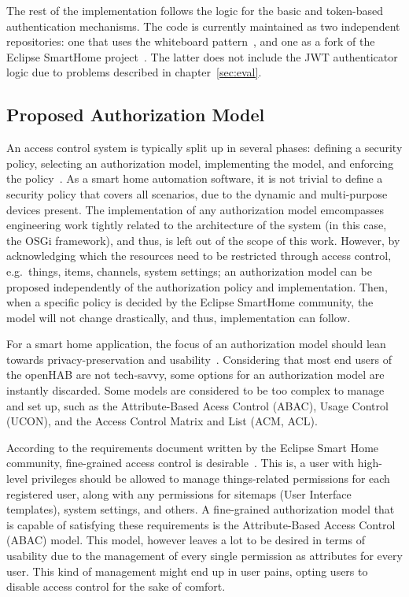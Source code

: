 \documentclass[12pt]{article}
\begin{document}
The rest of the implementation follows the logic for the basic and token-based authentication mechanisms. The code is currently maintained as two independent repositories: one that uses the whiteboard pattern~\cite{repo_02}, and one as a fork of the Eclipse SmartHome project~\cite{repo_01}. The latter does not include the JWT authenticator logic due to problems described in chapter~\ref{sec:eval}.
  
\subsection{Proposed Authorization Model}
\label{ssec:autho}

An access control system is typically split up in several phases: defining a security policy, selecting an authorization model, implementing the model, and enforcing the policy~\cite{access_01}. As a smart home automation software, it is not trivial to define a security policy that covers all scenarios, due to the dynamic and multi-purpose devices present. The implementation of any authorization model emcompasses engineering work tightly related to the architecture of the system (in this case, the OSGi framework), and thus, is left out of the scope of this work. However, by acknowledging which the resources need to be restricted through access control, e.g.\ things, items, channels, system settings; an authorization model can be proposed independently of the authorization policy and implementation. Then, when a specific policy is decided by the Eclipse SmartHome community, the model will not change drastically, and thus, implementation can follow. 

For a smart home application, the focus of an authorization model should lean towards privacy-preservation and usability~\cite{access_01}. Considering that most end users of the openHAB are not tech-savvy, some options for an authorization model are instantly discarded. Some models are considered to be too complex to manage and set up, such as the Attribute-Based Acess Control (ABAC), Usage Control (UCON), and the Access Control Matrix and List (ACM, ACL).

According to the requirements document written by the Eclipse Smart Home community, fine-grained access control is desirable~\cite{esh_06}. This is, a user with high-level privileges should be allowed to manage things-related permissions for each registered user, along with any permissions for sitemaps (User Interface templates), system settings, and others. A fine-grained authorization model that is capable of satisfying these requirements is the Attribute-Based Access Control (ABAC) model. This model, however leaves a lot to be desired in terms of usability due to the management of every single permission as attributes for every user. This kind of management might end up in user pains, opting users to disable access control for the sake of comfort. 
\end{document}
